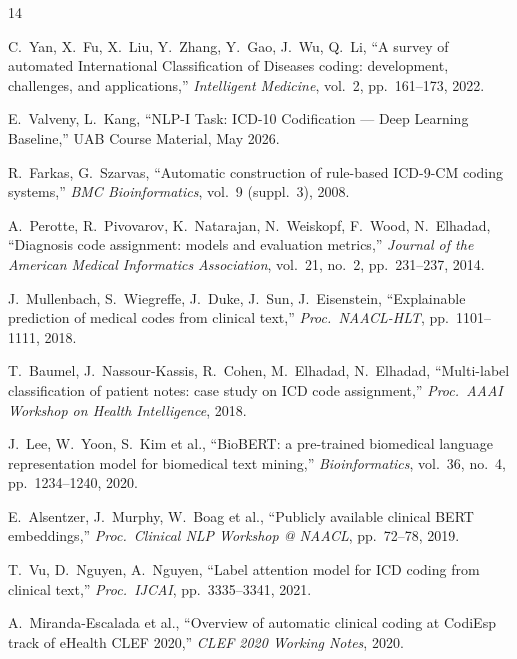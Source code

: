 \documentclass[10pt,a4paper,twocolumn]{article}
\begin{document}
\begin{thebibliography}{14}

C.\ Yan, X.\ Fu, X.\ Liu, Y.\ Zhang, Y.\ Gao, J.\ Wu, Q.\ Li,
``A survey of automated International Classification of Diseases coding:
development, challenges, and applications,''
\textit{Intelligent Medicine}, vol.~2, pp.~161--173, 2022.

E.\ Valveny, L.\ Kang,
``NLP-I Task: ICD-10 Codification --- Deep Learning Baseline,''
UAB Course Material, May 2026.

R.\ Farkas, G.\ Szarvas,
``Automatic construction of rule-based ICD-9-CM coding systems,''
\textit{BMC Bioinformatics}, vol.~9 (suppl.~3), 2008.

A.\ Perotte, R.\ Pivovarov, K.\ Natarajan, N.\ Weiskopf, F.\ Wood, N.\ Elhadad,
``Diagnosis code assignment: models and evaluation metrics,''
\textit{Journal of the American Medical Informatics Association}, vol.~21, no.~2,
pp.~231--237, 2014.

J.\ Mullenbach, S.\ Wiegreffe, J.\ Duke, J.\ Sun, J.\ Eisenstein,
``Explainable prediction of medical codes from clinical text,''
\textit{Proc.\ NAACL-HLT}, pp.~1101--1111, 2018.

T.\ Baumel, J.\ Nassour-Kassis, R.\ Cohen, M.\ Elhadad, N.\ Elhadad,
``Multi-label classification of patient notes: case study on ICD code assignment,''
\textit{Proc.\ AAAI Workshop on Health Intelligence}, 2018.

J.\ Lee, W.\ Yoon, S.\ Kim et al.,
``BioBERT: a pre-trained biomedical language representation model for
biomedical text mining,''
\textit{Bioinformatics}, vol.~36, no.~4, pp.~1234--1240, 2020.

E.\ Alsentzer, J.\ Murphy, W.\ Boag et al.,
``Publicly available clinical BERT embeddings,''
\textit{Proc.\ Clinical NLP Workshop @ NAACL}, pp.~72--78, 2019.

T.\ Vu, D.\ Nguyen, A.\ Nguyen,
``Label attention model for ICD coding from clinical text,''
\textit{Proc.\ IJCAI}, pp.~3335--3341, 2021.

A.\ Miranda-Escalada et al.,
``Overview of automatic clinical coding at CodiEsp track of eHealth CLEF 2020,''
\textit{CLEF 2020 Working Notes}, 2020.


\end{thebibliography}
\end{document}
